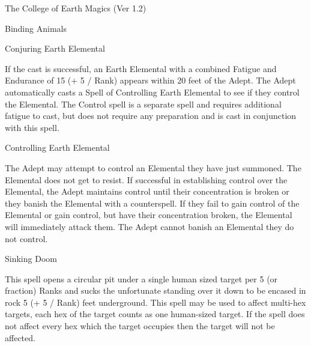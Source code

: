 \begin{Chapter}{The College of Earth Magics (Ver 1.2)}
\begin{spell}[S-9]{Binding Animals}
\begin{effects}
\end{effects}
\end{spell}

\begin{spell}[S-10]{Conjuring Earth Elemental}

\begin{effects}
If the cast is successful, an Earth Elemental with a combined Fatigue
and Endurance of 15 (+ 5 / Rank) appears within 20 feet of the Adept.
The Adept automatically casts a Spell of Controlling Earth Elemental
to see if they control the Elemental. The Control spell is a separate
spell and requires additional fatigue to cast, but does not require
any preparation and is cast in conjunction with this spell.

\end{effects}
\end{spell}

\begin{spell}[S-11]{Controlling Earth Elemental}

\begin{effects}
The Adept may attempt to control an Elemental they have just summoned.
The Elemental does not get to resist.  If successful in establishing
control over the Elemental, the Adept maintains control until their
concentration is broken or they banish the Elemental with a
counterspell.  If they fail to gain control of the Elemental or gain
control, but have their concentration broken, the Elemental will
immediately attack them.  The Adept cannot banish an Elemental they do
not control.

\end{effects}
\end{spell}

\begin{spell}[S-12]{Sinking Doom}

\begin{effects}
This spell opens a circular pit under a single human sized target per
5 (or fraction) Ranks and sucks the unfortunate standing over it down
to be encased in rock 5 (+ 5 / Rank) feet underground.  This spell may
be used to affect multi-hex targets, each hex of the target counts as
one human-sized target. If the spell does not affect every hex which
the target occupies then the target will not be affected.
\end{effects}
\end{spell}


\end{Chapter}
